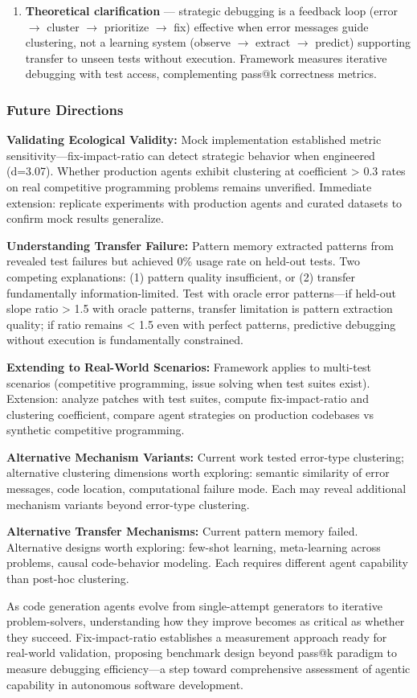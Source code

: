 \begin{enumerate}
\item \textbf{Theoretical clarification} --- strategic debugging is a feedback loop (error $\rightarrow$ cluster $\rightarrow$ prioritize $\rightarrow$ fix) effective when error messages guide clustering, not a learning system (observe $\rightarrow$ extract $\rightarrow$ predict) supporting transfer to unseen tests without execution. Framework measures iterative debugging with test access, complementing pass@k correctness metrics.
\end{enumerate}

\subsubsection{Future Directions}

\textbf{Validating Ecological Validity:} Mock implementation established metric sensitivity---fix-impact-ratio can detect strategic behavior when engineered (d=3.07). Whether production agents exhibit clustering at coefficient > 0.3 rates on real competitive programming problems remains unverified. Immediate extension: replicate experiments with production agents and curated datasets to confirm mock results generalize.

\textbf{Understanding Transfer Failure:} Pattern memory extracted patterns from revealed test failures but achieved 0\% usage rate on held-out tests. Two competing explanations: (1) pattern quality insufficient, or (2) transfer fundamentally information-limited. Test with oracle error patterns---if held-out slope ratio > 1.5 with oracle patterns, transfer limitation is pattern extraction quality; if ratio remains < 1.5 even with perfect patterns, predictive debugging without execution is fundamentally constrained.

\textbf{Extending to Real-World Scenarios:} Framework applies to multi-test scenarios (competitive programming, issue solving when test suites exist). Extension: analyze patches with test suites, compute fix-impact-ratio and clustering coefficient, compare agent strategies on production codebases vs synthetic competitive programming.

\textbf{Alternative Mechanism Variants:} Current work tested error-type clustering; alternative clustering dimensions worth exploring: semantic similarity of error messages, code location, computational failure mode. Each may reveal additional mechanism variants beyond error-type clustering.

\textbf{Alternative Transfer Mechanisms:} Current pattern memory failed. Alternative designs worth exploring: few-shot learning, meta-learning across problems, causal code-behavior modeling. Each requires different agent capability than post-hoc clustering.

As code generation agents evolve from single-attempt generators to iterative problem-solvers, understanding how they improve becomes as critical as whether they succeed. Fix-impact-ratio establishes a measurement approach ready for real-world validation, proposing benchmark design beyond pass@k paradigm to measure debugging efficiency---a step toward comprehensive assessment of agentic capability in autonomous software development.
